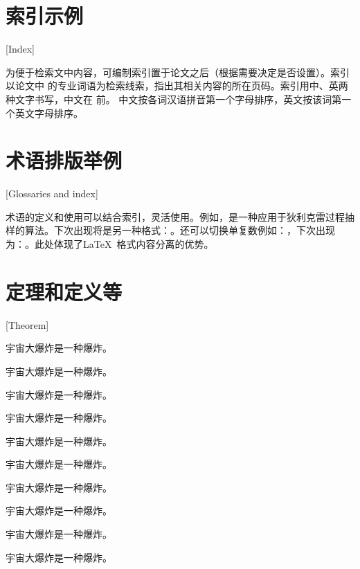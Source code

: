\section{索引示例}[Index]

为便于检索文中内容，可编制索引置于论文之后（根据需要决定是否设置）。索引以论文中
的专业词语为检索线索，指出其相关内容的所在页码。索引用中、英两种文字书写，中文在
前。
中文按各词汉语拼音第一个字母排序，英文按该词第一个英文字母排序。

\section{术语排版举例}[Glossaries and index]

术语的定义和使用可以结合索引，灵活使用。例如，\gtssbp 是一种应用于狄利克雷过程抽样的算法。下次出现将是另一种格式：\gtssbp 。还可以切换单复数例如：\gscna ，下次出现为：\gscnas 。此处体现了\LaTeX\ 格式内容分离的优势。

\section{定理和定义等}[Theorem]

\begin{theorem}
宇宙大爆炸是一种爆炸。
\end{theorem}
\begin{definition}[（霍金）]
宇宙大爆炸是一种爆炸。
\end{definition}
\begin{assumption}
宇宙大爆炸是一种爆炸。
\end{assumption}
\begin{lemma}
宇宙大爆炸是一种爆炸。
\end{lemma}
\begin{corollary}
宇宙大爆炸是一种爆炸。
\end{corollary}
\begin{exercise}
宇宙大爆炸是一种爆炸。
\end{exercise}
\begin{problem}
宇宙大爆炸是一种爆炸。
\end{problem}
\begin{remark}
宇宙大爆炸是一种爆炸。
\end{remark}
\begin{axiom}[（爱因斯坦）]
宇宙大爆炸是一种爆炸。
\end{axiom}
\begin{conjecture}
宇宙大爆炸是一种爆炸。
\end{conjecture}


